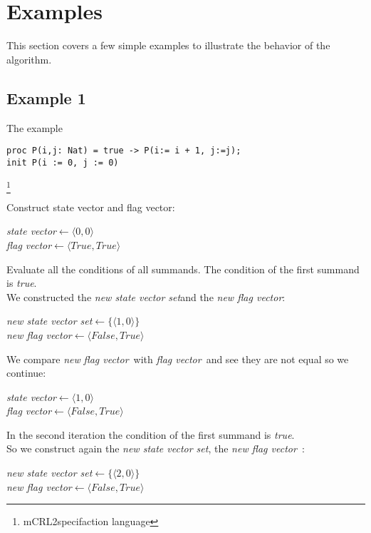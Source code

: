 \documentclass[a4paper,10pt]{article}
\newcommand{\mcrl}{mCRL2}
\newcommand{\ti}{\textit}
\newcommand{\sv}{\textit{state vector}}
\newcommand{\fv}{\textit{flag vector}}
\newcommand{\svs}{\textit{new state vector set}}
\newcommand{\nfv}{\textit{new flag vector}}
\newcommand{\la}{$\leftarrow$}
\begin{document}
\section{Examples}
This section covers a few simple examples to illustrate the behavior of the algorithm. 
\subsection{Example 1} The example \\
\begin{verbatim}
proc P(i,j: Nat) = true -> P(i:= i + 1, j:=j);
init P(i := 0, j := 0)
\end{verbatim} \footnote{\mcrl specifaction language}

Construct state vector and flag vector: 
\begin{center}\begin{minipage}{250pt}
\sv \la  $\langle 0 , 0 \rangle$\\
\fv \la  $\langle True , True \rangle$\\
\end{minipage}\end{center}

Evaluate all the conditions of all summands.
The condition of the first summand is \ti{true}.\\

We constructed the \svs and the \nfv :
\begin{center}\begin{minipage}{250pt}
\svs \la  $\lbrace \langle 1 , 0 \rangle \rbrace $\\
\nfv \la $\langle False , True \rangle $
\end{minipage}\end{center}

We compare \ti{new} \fv\ with \fv\ and see they are not equal so we continue:
\begin{center}\begin{minipage}{250pt}
\sv \la $\langle 1 , 0 \rangle $\\
\fv \la $\langle False , True \rangle $\\
\end{minipage}\end{center}

In the second iteration the condition of the first summand is \ti{true}.\\
So we construct again the \svs, the \nfv\ : 
\begin{center}\begin{minipage}{250pt}
\svs \la  $\lbrace \langle 2 , 0 \rangle \rbrace $\\
\nfv \la  $\langle False , True \rangle $ \\
\end{minipage}\end{center}
\end{document}

